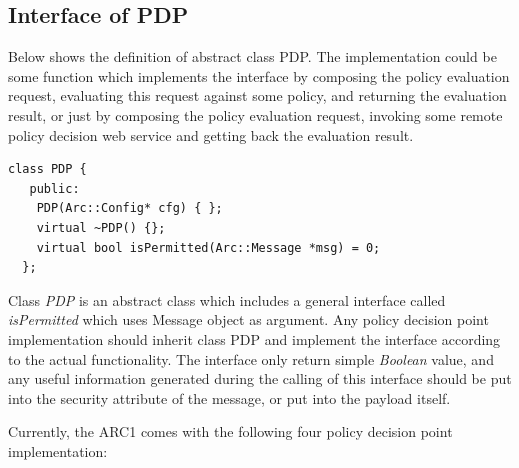 \documentclass{article}                            %
\begin{document}
\subsection{Interface of PDP} %
\label{subsec:interface_pdp}

Below shows the definition of abstract class PDP. The implementation could be some function which implements the interface by composing the policy evaluation request, evaluating this request against some policy, and returning the evaluation result, or just by composing the policy evaluation request, invoking some remote policy decision web service and getting back the evaluation result.

\begin{verbatim}
class PDP {
   public:
    PDP(Arc::Config* cfg) { };
    virtual ~PDP() {};
    virtual bool isPermitted(Arc::Message *msg) = 0;
  };
\end{verbatim}

Class \textit{PDP} is an abstract class which includes a general interface called \textit{isPermitted} which uses Message object as argument. Any policy decision point implementation should inherit class PDP and implement the interface according to the actual functionality. The interface only return simple \textit{Boolean} value, and any useful information generated during the calling of this interface should be put into the security attribute of the message, or put into the payload itself.

Currently, the ARC1 comes with the following four policy decision point implementation:
\end{document}
